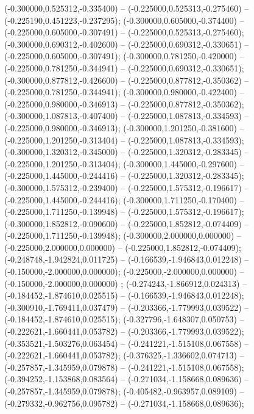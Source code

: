 (-0.300000,0.525312,-0.335400) -- (-0.225000,0.525313,-0.275460) -- (-0.225190,0.451223,-0.237295);
 (-0.300000,0.605000,-0.374400) -- (-0.225000,0.605000,-0.307491) -- (-0.225000,0.525313,-0.275460);
 (-0.300000,0.690312,-0.402600) -- (-0.225000,0.690312,-0.330651) -- (-0.225000,0.605000,-0.307491);
 (-0.300000,0.781250,-0.420000) -- (-0.225000,0.781250,-0.344941) -- (-0.225000,0.690312,-0.330651);
 (-0.300000,0.877812,-0.426600) -- (-0.225000,0.877812,-0.350362) -- (-0.225000,0.781250,-0.344941);
 (-0.300000,0.980000,-0.422400) -- (-0.225000,0.980000,-0.346913) -- (-0.225000,0.877812,-0.350362);
 (-0.300000,1.087813,-0.407400) -- (-0.225000,1.087813,-0.334593) -- (-0.225000,0.980000,-0.346913);
 (-0.300000,1.201250,-0.381600) -- (-0.225000,1.201250,-0.313404) -- (-0.225000,1.087813,-0.334593);
 (-0.300000,1.320312,-0.345000) -- (-0.225000,1.320312,-0.283345) -- (-0.225000,1.201250,-0.313404);
 (-0.300000,1.445000,-0.297600) -- (-0.225000,1.445000,-0.244416) -- (-0.225000,1.320312,-0.283345);
 (-0.300000,1.575312,-0.239400) -- (-0.225000,1.575312,-0.196617) -- (-0.225000,1.445000,-0.244416);
 (-0.300000,1.711250,-0.170400) -- (-0.225000,1.711250,-0.139948) -- (-0.225000,1.575312,-0.196617);
 (-0.300000,1.852812,-0.090600) -- (-0.225000,1.852812,-0.074409) -- (-0.225000,1.711250,-0.139948);
 (-0.300000,2.000000,0.000000) -- (-0.225000,2.000000,0.000000) -- (-0.225000,1.852812,-0.074409);
 (-0.248748,-1.942824,0.011725) -- (-0.166539,-1.946843,0.012248) -- (-0.150000,-2.000000,0.000000);
 (-0.225000,-2.000000,0.000000) -- (-0.150000,-2.000000,0.000000) ;
 (-0.274243,-1.866912,0.024313) -- (-0.184452,-1.874610,0.025515) -- (-0.166539,-1.946843,0.012248);
 (-0.300910,-1.769411,0.037479) -- (-0.203366,-1.779993,0.039522) -- (-0.184452,-1.874610,0.025515);
 (-0.327796,-1.648307,0.050753) -- (-0.222621,-1.660441,0.053782) -- (-0.203366,-1.779993,0.039522);
 (-0.353521,-1.503276,0.063454) -- (-0.241221,-1.515108,0.067558) -- (-0.222621,-1.660441,0.053782);
 (-0.376325,-1.336602,0.074713) -- (-0.257857,-1.345959,0.079878) -- (-0.241221,-1.515108,0.067558);
 (-0.394252,-1.153868,0.083564) -- (-0.271034,-1.158668,0.089636) -- (-0.257857,-1.345959,0.079878);
 (-0.405482,-0.963957,0.089109) -- (-0.279332,-0.962756,0.095782) -- (-0.271034,-1.158668,0.089636);
